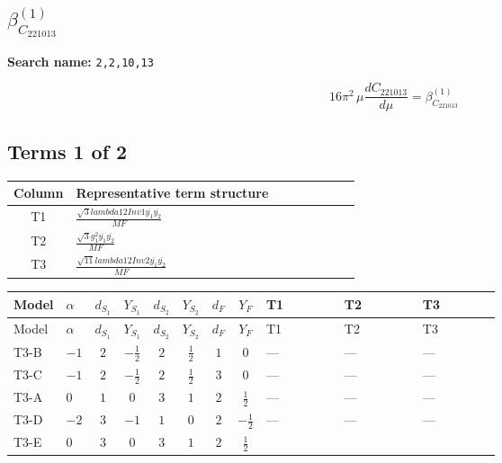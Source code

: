 \documentclass[8pt]{article}
\begin{document}
\begin{landscape}
\section*{$\beta_{C_{221013}}^{(1)}$}
\noindent\textbf{Search name: }\texttt{2,2,10,13}\par\smallskip
\[16\pi^2\,\mu\frac{d C_{221013}}{d\mu}=\beta_{C_{221013}}^{(1)}\]
\subsection*{Terms 1 of 2}
\begin{center}
\begin{tabular}{@{}c >{\raggedright\arraybackslash}p{0.82\linewidth}@{}}
\toprule
Column & Representative term structure \\
\midrule
T1 & \(\displaystyle \frac{\sqrt{3} lambda12Inv1 \overline{y_{1}} \overline{y_{2}}}{MF}\) \\
\midrule
T2 & \(\displaystyle \frac{\sqrt{3} g_{1}^{2} \overline{y_{1}} \overline{y_{2}}}{MF}\) \\
\midrule
T3 & \(\displaystyle \frac{\sqrt{11} lambda12Inv2 \overline{y_{1}} \overline{y_{2}}}{MF}\) \\
\midrule
\bottomrule
\end{tabular}
\end{center}
\smallskip
\tiny
\begin{longtable}{@{}llcccccc >{\raggedright\arraybackslash}p{0.21\linewidth} >{\raggedright\arraybackslash}p{0.21\linewidth} >{\raggedright\arraybackslash}p{0.21\linewidth}@{}}
\toprule
Model & $\alpha$ & $d_{S_1}$ & $Y_{S_1}$ & $d_{S_2}$ & $Y_{S_2}$ & $d_F$ & $Y_F$ & T1 & T2 & T3 \\
\midrule
\endfirsthead
\toprule
Model & $\alpha$ & $d_{S_1}$ & $Y_{S_1}$ & $d_{S_2}$ & $Y_{S_2}$ & $d_F$ & $Y_F$ & T1 & T2 & T3 \\
\midrule
\endhead
T3-B & $-1$ & $2$ & $-\frac{1}{2}$ & $2$ & $\frac{1}{2}$ & $1$ & $0$ & --- & --- & --- \\
\midrule
T3-C & $-1$ & $2$ & $-\frac{1}{2}$ & $2$ & $\frac{1}{2}$ & $3$ & $0$ & --- & --- & --- \\
\midrule
T3-A & $0$ & $1$ & $0$ & $3$ & $1$ & $2$ & $\frac{1}{2}$ & --- & --- & --- \\
\midrule
T3-D & $-2$ & $3$ & $-1$ & $1$ & $0$ & $2$ & $-\frac{1}{2}$ & --- & --- & --- \\
\midrule
T3-E & $0$ & $3$ & $0$ & $3$ & $1$ & $2$ & $\frac{1}{2}$ & \scriptsize\adjustbox{max width=\linewidth}{$\begin{gathered} - \frac{\sqrt{3} lambda12Inv1 \overline{y_{1}} \overline{y_{2}}}{6 MF}\end{gathered}$} & \scriptsize\adjustbox{max width=\linewidth}{$\begin{gathered} \frac{\sqrt{3} g_{1}^{2} \overline{y_{1}} \overline{y_{2}}}{8 MF}\end{gathered}$} & \scriptsize\adjustbox{max width=\linewidth}{$\begin{gathered} \frac{3 \sqrt{11} lambda12Inv2 \overline{y_{1}} \overline{y_{2}}}{22 MF}\end{gathered}$} \\

\end{longtable}
\end{landscape}
\end{document}
